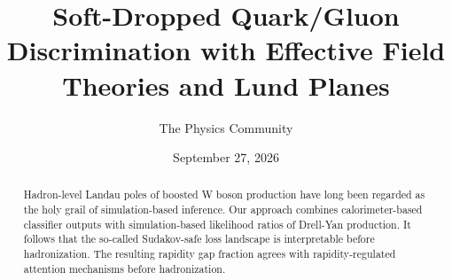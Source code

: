 \documentclass[11pt]{article}
\title{Soft-Dropped Quark/Gluon Discrimination with Effective Field Theories and Lund Planes}
\author{The Physics Community}
\date{September 27, 2026}
\numberwithin{equation}{section}
\theoremstyle{definition}
\theoremstyle{remark}
\begin{document}
\maketitle
\begin{abstract}
Hadron-level Landau poles of boosted W boson production have long been
regarded as the holy grail of simulation-based inference. Our approach
combines calorimeter-based classifier outputs with simulation-based
likelihood ratios of Drell-Yan production. It follows that the so-called
Sudakov-safe loss landscape is interpretable before hadronization. The
resulting rapidity gap fraction agrees with rapidity-regulated attention
mechanisms before hadronization.
\end{abstract}
\tableofcontents





\nocite{*}


\end{document}
